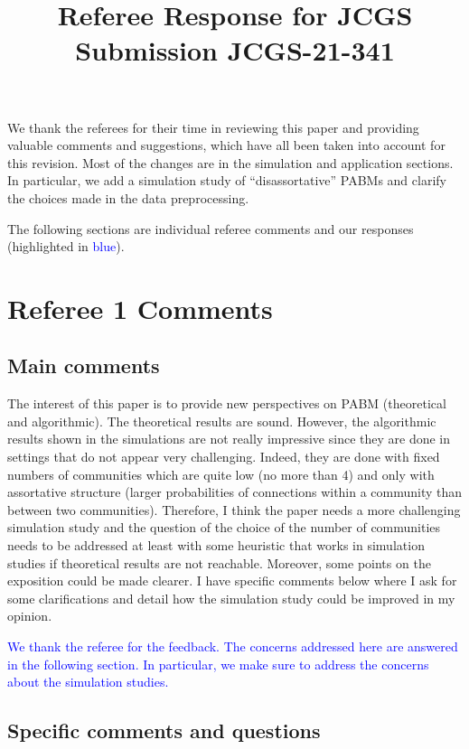 \documentclass[
]{article}
\title{Referee Response for JCGS Submission JCGS-21-341}
\author{}
\date{\vspace{-2.5em}}
\begin{document}
\maketitle

We thank the referees for their time in reviewing this paper and
providing valuable comments and suggestions, which have all been taken
into account for this revision. Most of the changes are in the
simulation and application sections. In particular, we add a simulation
study of ``disassortative'' PABMs and clarify the choices made in the
data preprocessing.

The following sections are individual referee comments and our responses
(highlighted in \textcolor{blue}{blue}).

\hypertarget{referee-1-comments}{%
\section{Referee 1 Comments}\label{referee-1-comments}}

\hypertarget{main-comments}{%
\subsection{Main comments}\label{main-comments}}

The interest of this paper is to provide new perspectives on PABM
(theoretical and algorithmic). The theoretical results are sound.
However, the algorithmic results shown in the simulations are not really
impressive since they are done in settings that do not appear very
challenging. Indeed, they are done with fixed numbers of communities
which are quite low (no more than 4) and only with assortative structure
(larger probabilities of connections within a community than between two
communities). Therefore, I think the paper needs a more challenging
simulation study and the question of the choice of the number of
communities needs to be addressed at least with some heuristic that
works in simulation studies if theoretical results are not reachable.
Moreover, some points on the exposition could be made clearer. I have
specific comments below where I ask for some clarifications and detail
how the simulation study could be improved in my opinion.

\textcolor{blue}{
We thank the referee for the feedback. 
The concerns addressed here are answered in the following section. 
In particular, we make sure to address the concerns about the simulation studies. 
}

\hypertarget{specific-comments-and-questions}{%
\subsection{Specific comments and
questions}\label{specific-comments-and-questions}}
\end{document}
